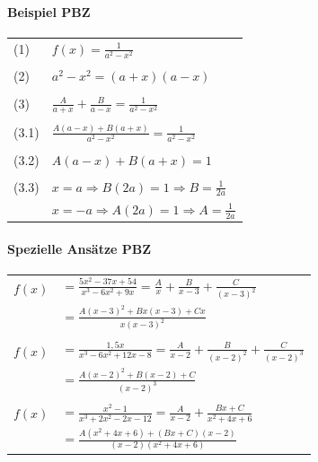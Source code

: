 			\paragraph{Beispiel PBZ}
			
			\begin{tabular}{ll}
			(1) & $f(x) = \frac{1}{a^2 - x^2}$ \\
			\\
			(2) & $a^2 - x^2 = (a+x)(a-x)$ \\
			\\
			(3) & $\frac{A}{a+x} + \frac{B}{a-x} = \frac{1}{a^2 - x^2}$\\
			\\
			(3.1) & $\frac{A(a-x) + B(a+x)}{a^2 - x^2} = \frac{1}{a^2 - x^2}$ \\
			\\
			(3.2) &$ A(a-x) + B(a+x) = 1$ \\
			\\
			(3.3) & $x = a \Rightarrow B(2a) = 1 \Rightarrow B = \frac{1}{2a} $ \\			
			& $x = -a \Rightarrow A(2a) = 1 \Rightarrow A = \frac{1}{2a} $ \\
			\end{tabular}
		
		
			\paragraph{Spezielle Ansätze PBZ}
			\begin{tabular}{ll}
			$f(x)$ & $=\frac{5x^2-37x+54}{x^3-6x^2+9x} =  \frac{A}{x}+\frac{B}{x-3}+\frac{C}{(x-3)^2}$ \\ 					 			& $=\frac{A(x-3)^2+Bx(x-3)+Cx}{x(x-3)^2}$ \\
			\\
			$f(x)$ & $=\frac{1,5x}{x^3-6x^2+12x-8}=\frac{A}{x-2}+\frac{B}{(x-2)^2}+\frac{C}{(x-2)^3}$ \\		 			    & $=\frac{A(x-2)^2+B(x-2)+C}{(x-2)^3}$ \\
			\\
			$f(x)$ & $=\frac{x^2-1}{x^3+2x^2-2x-12}=\frac{A}{x-2}+\frac{Bx+C}{x^2+4x+6}$ \\
			& $=\frac{A(x^2+4x+6)+(Bx+C)(x-2)}{(x-2)(x^2+4x+6)}$ \\
			\end{tabular}
		
			
